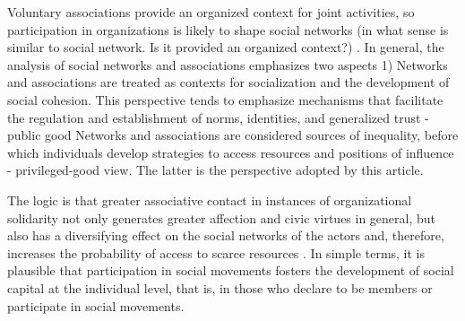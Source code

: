 Voluntary associations provide an organized context for joint activities, so participation in organizations is likely to shape social networks {\color{blue} (in what sense is similar to social network. Is it provided an organized context?)} \parencite{feld_focused_1981,mcpherson_social_1992}. In general, the analysis of social networks and associations emphasizes two aspects 1) Networks and associations are treated as contexts for socialization and the development of social cohesion. This perspective tends to emphasize mechanisms that facilitate the regulation and establishment of norms, identities, and generalized trust \parencite{glanville_voluntary_2004,glanville_why_2016,paxton_association_2007,paxton_trust_2018} - public good Networks and associations are considered sources of inequality, before which individuals develop strategies to access resources and positions of influence \parencite{bekkers_social_2008} - privileged-good view. The latter is the perspective adopted by this article.

\bigskip

The logic is that greater associative contact in instances of organizational solidarity not only generates greater affection and civic virtues in general, but also has a diversifying effect on the social networks of the actors and, therefore, increases the probability of access to scarce resources \parencite{diani_social_1997,malinick_network_2013,tindall_network_2012,benton_uniters_2016}. In simple terms, it is plausible that participation in social movements fosters the development of social capital at the individual level, that is, in those who declare to be members or participate in social movements. 
\bigskip

